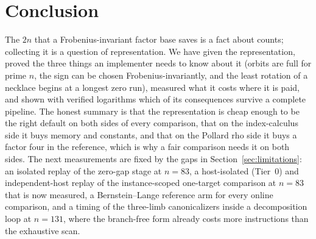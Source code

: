 \section{Conclusion}
\label{sec:conclusion}

The $2n$ that a Frobenius-invariant factor base saves is a fact about
counts; collecting it is a question of representation. We have given
the representation, proved the three things an implementer needs to
know about it (orbits are full for prime $n$, the sign can be chosen
Frobenius-invariantly, and the least rotation of a necklace begins at
a longest zero run), measured what it costs where it is paid, and
shown with verified logarithms which of its consequences survive a
complete pipeline. The honest summary is that the representation is
cheap enough to be the right default on both sides of every
comparison, that on the index-calculus side it buys memory and
constants, and that on the Pollard rho side it buys a factor four in
the reference, which is why a fair comparison needs it on both sides.
The next measurements are fixed by the gaps in
Section~\ref{sec:limitations}: an isolated replay of the zero-gap stage
at $n=83$, a host-isolated (Tier~0) and independent-host replay of the
instance-scoped one-target comparison at $n=83$ that is now measured, a Bernstein--Lange reference arm
for every online comparison, and a timing of the three-limb
canonicalizers inside a decomposition loop at $n=131$, where the
branch-free form already costs more instructions than the
exhaustive scan.
